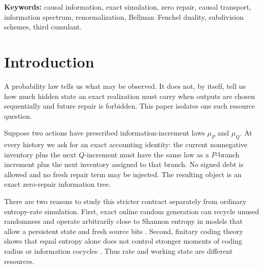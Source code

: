 \documentclass[11pt,a4paper]{article}
\theoremstyle{definition}
\theoremstyle{remark}
\newcommand{\cB}{\mathcal B}
\begin{document}
\begin{abstract}
Finally, we pass from viability sets to lower support functionals, derive an
exact finite-dimensional Bellman--Fenchel recursion, identify the cubic shift
normal form
\[
P^*-Q^*=\tfrac14E^2(I-E)^3,
\]
and introduce a Green coordinate in which the cubic defect becomes a positive
unit source.  The two-block boundary mask is \((1+z)^3/4\), the binary
quadratic B-spline mask, and one explicit mean-neutral phase channel admits a
uniform finite-mean envelope across all dyadic scales.  These statements do
not prove a matching \(O(\log n)\) upper bound.  Fixed-block phase feasibility
is now completely characterized at the level of finite-dimensional linear
programming; what remains is the genuinely multiscale problem of finding a
scale-stable description compatible with future zero-repair viability.  In
particular, a uniform bound on \(\cB_{2n}-\cB_n\) would close the order of
growth.

The zero-repair bill is deliberately distinguished from unrestricted causal
Shannon entropy.  It measures exact causal working inventory, not entropy rate;
this distinction is the link back to the broader question of which resources
an exact stochastic realization must carry.
\end{abstract}

\noindent\textbf{Keywords:} causal information, exact simulation, zero repair,
causal transport, information spectrum, renormalization, Bellman--Fenchel
duality, subdivision schemes, third cumulant.

\section{Introduction}

A probability law tells us what may be observed.  It does not, by itself, tell
us how much hidden state an exact realization must carry when outputs are
chosen sequentially and future repair is forbidden.  This paper isolates one
such resource question.

Suppose two actions have prescribed information-increment laws \(\mu_P\) and
\(\mu_Q\).  At every history we ask for an exact accounting identity: the
current nonnegative inventory plus the next \(Q\)-increment must have the same
law as a \(P\)-branch increment plus the next inventory assigned to that branch.
No signed debt is allowed and no fresh repair term may be injected.  The
resulting object is an exact zero-repair information tree.

There are two reasons to study this stricter contract separately from ordinary
entropy-rate simulation.  First, exact online random generation can recycle
unused randomness and operate arbitrarily close to Shannon entropy in models
that allow a persistent state and fresh source bits
\cite{DraperSaad2026,DraperHarrisSaad2026}.  Second, finitary coding theory
shows that equal entropy alone does not control stronger moments of coding
radius or information cocycles \cite{Parry1979,Schmidt1984,HarveyPeres2011}.
Thus rate and working state are different resources.
\end{document}

